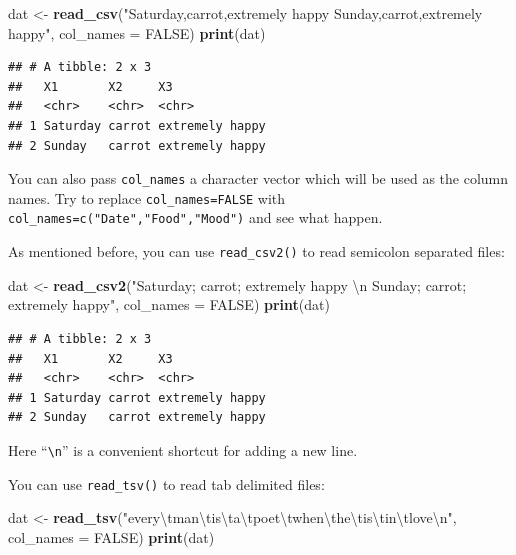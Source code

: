 \documentclass[12pt,]{krantz}
\makeatletter
\newenvironment{Shaded}{\begin{snugshade}}{\end{snugshade}}
\newcommand{\CharTok}[1]{\textcolor[rgb]{0.5,0.5,0.5}{#1}}
\newcommand{\DataTypeTok}[1]{\textcolor[rgb]{0.27,0.27,0.27}{#1}}
\newcommand{\KeywordTok}[1]{\textcolor[rgb]{0.27,0.27,0.27}{\textbf{#1}}}
\newcommand{\NormalTok}[1]{#1}
\newcommand{\OtherTok}[1]{\textcolor[rgb]{0.37,0.37,0.37}{#1}}
\newcommand{\StringTok}[1]{\textcolor[rgb]{0.5,0.5,0.5}{#1}}
\newenvironment{kframe}{%
\medskip{}
\setlength{\fboxsep}{.8em}
 \def\at@end@of@kframe{}%
 \ifinner\ifhmode%
  \def\at@end@of@kframe{\end{minipage}}%
  \begin{minipage}{\columnwidth}%
 \fi\fi%
 \def\FrameCommand##1{\hskip\@totalleftmargin \hskip-\fboxsep
 \colorbox{shadecolor}{##1}\hskip-\fboxsep
     \hskip-\linewidth \hskip-\@totalleftmargin \hskip\columnwidth}%
 \MakeFramed {\advance\hsize-\width
   \@totalleftmargin\z@ \linewidth\hsize
   \@setminipage}}%
 {\par\unskip\endMakeFramed%
 \at@end@of@kframe}
\renewenvironment{Shaded}{\begin{kframe}}{\end{kframe}}
\makeatother
\begin{document}
\begin{Shaded}
\begin{Highlighting}[]
\NormalTok{dat <-}\StringTok{ }\KeywordTok{read_csv}\NormalTok{(}\StringTok{"Saturday,carrot,extremely happy}
\StringTok{          Sunday,carrot,extremely happy"}\NormalTok{, }\DataTypeTok{col_names =} \OtherTok{FALSE}\NormalTok{)}
\KeywordTok{print}\NormalTok{(dat)}
\end{Highlighting}
\end{Shaded}

\begin{verbatim}
## # A tibble: 2 x 3
##   X1       X2     X3             
##   <chr>    <chr>  <chr>          
## 1 Saturday carrot extremely happy
## 2 Sunday   carrot extremely happy
\end{verbatim}

You can also pass \texttt{col\_names} a character vector which will be used as the column names. Try to replace \texttt{col\_names=FALSE} with \texttt{col\_names=c("Date","Food","Mood")} and see what happen.

As mentioned before, you can use \texttt{read\_csv2()} to read semicolon separated files:

\begin{Shaded}
\begin{Highlighting}[]
\NormalTok{dat <-}\StringTok{ }\KeywordTok{read_csv2}\NormalTok{(}\StringTok{"Saturday; carrot; extremely happy }\CharTok{\textbackslash{}n}\StringTok{ }
\StringTok{                 Sunday; carrot; extremely happy"}\NormalTok{, }\DataTypeTok{col_names =} \OtherTok{FALSE}\NormalTok{)}
\KeywordTok{print}\NormalTok{(dat)}
\end{Highlighting}
\end{Shaded}

\begin{verbatim}
## # A tibble: 2 x 3
##   X1       X2     X3             
##   <chr>    <chr>  <chr>          
## 1 Saturday carrot extremely happy
## 2 Sunday   carrot extremely happy
\end{verbatim}

Here ``\texttt{\textbackslash{}n}'' is a convenient shortcut for adding a new line.

You can use \texttt{read\_tsv()} to read tab delimited files:

\begin{Shaded}
\begin{Highlighting}[]
\NormalTok{dat <-}\StringTok{ }\KeywordTok{read_tsv}\NormalTok{(}\StringTok{"every}\CharTok{\textbackslash{}t}\StringTok{man}\CharTok{\textbackslash{}t}\StringTok{is}\CharTok{\textbackslash{}t}\StringTok{a}\CharTok{\textbackslash{}t}\StringTok{poet}\CharTok{\textbackslash{}t}\StringTok{when}\CharTok{\textbackslash{}t}\StringTok{he}\CharTok{\textbackslash{}t}\StringTok{is}\CharTok{\textbackslash{}t}\StringTok{in}\CharTok{\textbackslash{}t}\StringTok{love}\CharTok{\textbackslash{}n}\StringTok{"}\NormalTok{, }
    \DataTypeTok{col_names =} \OtherTok{FALSE}\NormalTok{)}
\KeywordTok{print}\NormalTok{(dat)}
\end{Highlighting}
\end{Shaded}
\end{document}
